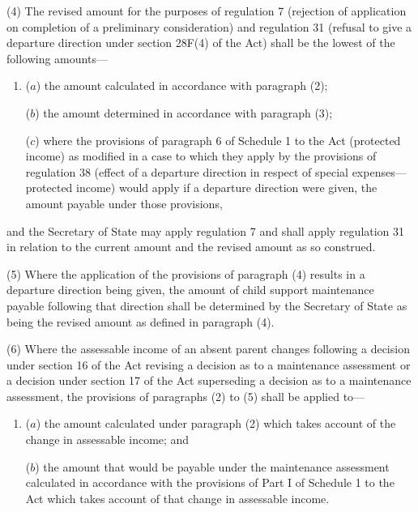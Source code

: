 \documentclass[12pt,a4paper]{article}
\begin{document}
(4) The revised amount for the purposes of regulation 7 (rejection of application on completion of a preliminary consideration) and regulation 31 (refusal to give a departure direction under section 28F(4) of the Act) shall be the lowest of the following amounts—
\begin{enumerate}\item[]
($a$) the amount calculated in accordance with paragraph (2);

($b$) the amount determined in accordance with paragraph (3);

($c$) where the provisions of paragraph 6 of Schedule 1 to the Act (protected income) as modified in a case to which they apply by the provisions of regulation 38 (effect of a departure direction in respect of special expenses—protected income) would apply if a departure direction were given, the amount payable under those provisions,
\end{enumerate}
and the Secretary of State may apply regulation 7 and shall apply regulation 31 in relation to the current amount and the revised amount as so construed.

(5) 
Where the application of the provisions of paragraph (4) results in a departure direction being given, the amount of child support maintenance payable following that direction shall be determined by 
the Secretary of State  %
as being the revised amount as defined in paragraph (4).

(6) Where the assessable income of an absent parent changes following 
a decision under section 16 of the Act revising a decision as to a maintenance assessment or a decision under section 17 of the Act superseding a decision as to a maintenance assessment,  %
the provisions of paragraphs (2) to (5) shall be applied to—
\begin{enumerate}\item[]
($a$) the amount calculated under paragraph (2) which takes account of the change
in assessable income; and

($b$) the amount that would be payable under the maintenance assessment calculated
in accordance with the provisions of Part I of Schedule 1 to the Act which takes
account of that change in assessable income.
\end{enumerate}
\end{document}
